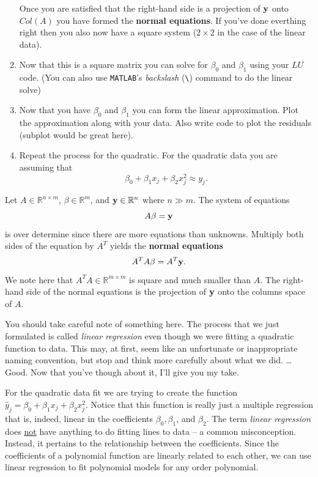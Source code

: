 \begin{problem}
\begin{enumerate}
            Once you are satisfied that the right-hand side is a projection of ${\bf y}$ onto
            $Col(A)$ you have formed the {\bf normal equations}.  If you've done everthing
            right then you also now have a square system ($2 \times 2$ in the case of the
            linear data).

        \item Now that this is a square matrix you can solve for $\beta_0$ and $\beta_1$ using
            your $LU$ code. (You can also use \texttt{MATLAB}'s {\it backslash} (\verb|\|) command to
            do the linear solve)
        \item Now that you have $\beta_0$ and $\beta_1$ you can form the linear approximation.
            Plot the approximation along with your data.  Also write code to plot the
            residuals (subplot would be great here).
        \item Repeat the process for the quadratic.  For the quadratic data
            you are assuming that 
            \[ \beta_0 + \beta_1 x_j + \beta_2 x_j^2 \approx y_j. \]
    \end{enumerate}
\end{problem}


\begin{definition}
    Let $A \in \mathbb{R}^{n \times m}$, $\beta \in \mathbb{R}^{m}$, and ${\bf y} \in
    \mathbb{R}^n$ where $n \gg m$.  The system of equations
    \[ A \beta = {\bf y} \]
    is over determine since there are more equations than unknowns.  Multiply both sides
    of the equation by $A^T$ yields the {\bf normal equations}
    \[ A^T A \beta = A^T {\bf y}. \]
    We note here that $A^T A \in \mathbb{R}^{m \times m}$ is square and much smaller than
    $A$.  The right-hand side of the normal equations is the projection of ${\bf y}$ onto the
    columns space of $A$.  
\end{definition}

You should take careful note of something here.  The process that we just formulated is
called {\it linear regression} even though we were fitting a quadratic function to data.
This may, at first, seem like an unfortunate or inappropriate naming convention, but stop
and think more carefully about what we did.  \ldots Good.  Now that you've though about
it, I'll give you my take.  

For the quadratic data fit we are trying to create the function $\hat{y}_j = \beta_0 +
\beta_1 x_j + \beta_2 x_j^2$.  Notice that this function is really just a multiple
regression that is, indeed, linear in the coefficients $\beta_0, \beta_1$, and $\beta_2$.
The term {\it linear regression} does \underline{not} have anything to do fitting lines to
data -- a common misconception.  Instead, it pertains to the relationship between the coefficients.
Since the coefficients of a polynomial function are linearly related to
each other, we can use linear regression to fit polynomial models for any order
polynomial.  

